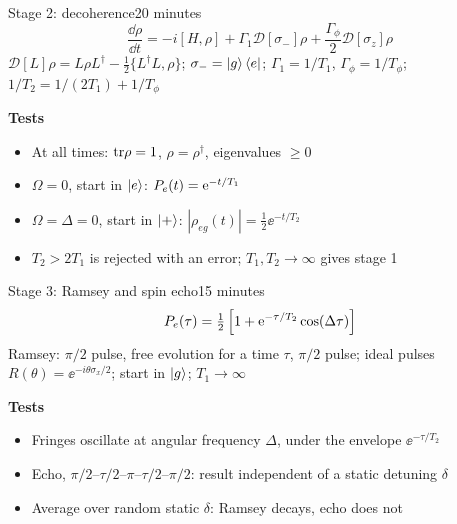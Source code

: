 \begin{frame}{Stage 2: decoherence}{20 minutes}
  \begin{equation*}
    \frac{\dd\rho}{\dd t} = -i[H, \rho] + \Gamma_1 \mathcal{D}[\sigma_-]\rho
      + \frac{\Gamma_\phi}{2}\mathcal{D}[\sigma_z]\rho
  \end{equation*}
  {\scriptsize\color{unibasGrey}
   $\mathcal{D}[L]\rho = L\rho L^\dagger - \tfrac12\{L^\dagger L, \rho\}$;\;
   $\sigma_- = \ket{g}\bra{e}$;\;
   $\Gamma_1 = 1/T_1$, $\Gamma_\phi = 1/T_\phi$;\;
   $1/T_2 = 1/(2T_1) + 1/T_\phi$}

  \vspace{1ex}
  \textbf{Tests}
  \begin{itemize}
    \item<2-> At all times: $\mathrm{tr}\rho = 1$, $\rho = \rho^\dagger$, eigenvalues $\geq 0$
    \item<3-> $\Omega = 0$, start in $\ket{e}$: $P_e(t) = \mathrm{e}^{-t/T_1}$
    \item<4-> $\Omega = \Delta = 0$, start in $\ket{+}$: $|\rho_{eg}(t)| = \tfrac12\ee^{-t/T_2}$
    \item<5-> $T_2 > 2T_1$ is rejected with an error; $T_1, T_2 \to \infty$ gives stage 1
  \end{itemize}
  {\scriptsize\color{unibasGrey}}
\end{frame}

\begin{frame}{Stage 3: Ramsey and spin echo}{15 minutes}
  \begin{equation*}
    P_e(\tau) = \tfrac12\left[1 + \mathrm{e}^{-\tau/T_2}\cos(\Delta\tau)\right]
  \end{equation*}
  {\scriptsize\color{unibasGrey}Ramsey: $\pi/2$ pulse, free evolution for a time $\tau$,
   $\pi/2$ pulse; ideal pulses $R(\theta) = \ee^{-i\theta\sigma_x/2}$; start in $\ket{g}$;
   $T_1 \to \infty$}

  \vspace{1ex}
  \textbf{Tests}
  \begin{itemize}
    \item<2-> Fringes oscillate at angular frequency $\Delta$, under the envelope $\ee^{-\tau/T_2}$
    \item<3-> Echo, $\pi/2$--$\tau/2$--$\pi$--$\tau/2$--$\pi/2$: result independent of
          a static detuning $\delta$
    \item<4-> Average over random static $\delta$: Ramsey decays, echo does not
  \end{itemize}
\end{frame}

